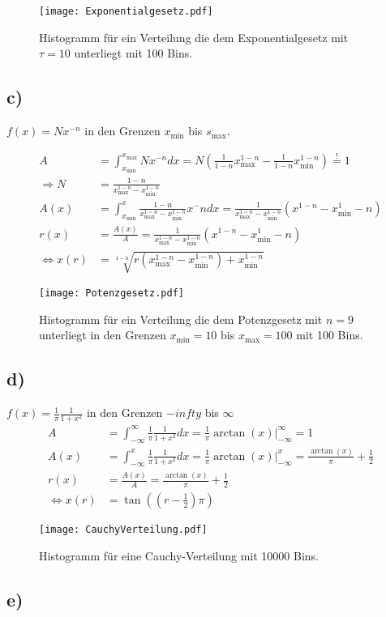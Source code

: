 \begin{figure}
  \centering
  \texttt{[image: Exponentialgesetz.pdf]}
  \caption{Histogramm für ein Verteilung die dem Exponentialgesetz mit $\tau=10$ unterliegt mit 100 Bins.}
  \label{fig:expo}
\end{figure}
\FloatBarrier

\subsection{c)}
\label{subsec:a3c}
$f(x)=Nx^{-n}$ in den Grenzen  $x_\text{min}$ bis $s_\text{max}$.

\begin{align}
A&=\int_{x_\text{min}}^{x_\text{max}} Nx^{-n} dx=
N(\frac{1}{1-n}x_\text{max}^{1-n}-\frac{1}{1-n}x_\text{min}^{1-n})\stackrel{!}{=}1\\
\Rightarrow N&=\frac{1-n}{x_\text{max}^{1-n}-x_\text{min}^{1-n}}\\
A(x)&=\int_{x_\text{min}}^x \frac{1-n}{x_\text{max}^{1-n}-x_\text{min}^{1-n}}x^-n dx=\frac{1}{x_\text{max}^{1-n}-x_\text{min}^{1-n}}\left(x^{1-n}-x_\text{min}^1-n\right)\\
r(x)&=\frac{A(x)}{A}=\frac{1}{x_\text{max}^{1-n}-x_\text{min}^{1-n}}\left(x^{1-n}-x_\text{min}^1-n\right)\\
\iff x(r) &=\sqrt[1-n]{r(x_\text{max}^{1-n}-x_\text{min}^{1-n})+x_\text{min}^{1-n}}
\end{align}


\begin{figure}
  \centering
  \texttt{[image: Potenzgesetz.pdf]}
  \caption{Histogramm für ein Verteilung die dem Potenzgesetz mit $n=9$ unterliegt in den Grenzen $x_\text{min}=10$ bis $x_\text{max}=100$  mit 100 Bins.}
  \label{fig:poten}
\end{figure}
\FloatBarrier



\subsection{d)}
\label{subsec:a3d}
$f(x)=\frac{1}{\pi}\frac{1}{1+x^{2}} $ in den Grenzen $-infty$ bis $\infty$
\begin{align}
A&=\int_{-\infty}^{\infty} \frac{1}{\pi}\frac{1}{1+x^{2}}dx =\frac{1}{\pi} \arctan(x)\bigr|_{-\infty}^{\infty}=1 \\
A(x)&=\int_{-\infty}^{x} \frac{1}{\pi}\frac{1}{1+x^{2}}dx =\frac{1}{\pi} \arctan(x)\bigr|_{-\infty}^{x}
=\frac{\arctan(x)}{\pi}+\frac{1}{2}\\
r(x)&=\frac{A(x)}{A}=\frac{\arctan(x)}{\pi}+\frac{1}{2}\\
\iff x(r)&=\tan\left(\left(r-\frac{1}{2}\right)\pi\right)
\end{align}

\begin{figure}
  \centering
  \texttt{[image: CauchyVerteilung.pdf]}
  \caption{Histogramm für eine Cauchy-Verteilung mit 10000 Bins.}
  \label{fig:cauchy}
\end{figure}

\subsection{e)}
\label{subsec:a3e}
